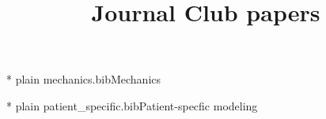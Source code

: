 \documentclass{article}
\title{Journal Club papers}
\begin{document}
  \maketitle

  \nocite{mechanics}{*}
  {plain}
  {mechanics.bib}{Mechanics}

  \nocite{patient_specific}{*}
  {plain}
  {patient_specific.bib}{Patient-specfic
    modeling}
  
\end{document}
